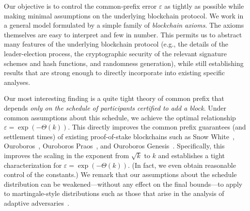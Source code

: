 Our objective is to control the common-prefix error
$\varepsilon$ as tightly as possible while
making minimal assumptions on the underlying blockchain
protocol.  We work in a general model formulated by a simple family of
\emph{blockchain axioms}. The axioms themselves are easy to interpret
and few in number. This permits us to abstract many features of the
underlying blockchain protocol (e.g., the details of the
leader-election process, the cryptographic security of the relevant
signature schemes and hash functions, and randomness generation),
while still establishing results that are strong enough to directly
incorporate into existing specific analyses.

Our most interesting finding is a quite tight theory of common prefix
that depends \emph{only on the schedule of participants certified to
  add a block}. Under common assumptions about this schedule, we
achieve the optimal relationship $\varepsilon =
\exp(-\Theta(k))$. This directly improves the common prefix guarantees
(and settlement times) of existing proof-of-stake blockchains such as
Snow White~\cite{DBLP:journals/iacr/BentovPS16a},
Ouroboros~\cite{KRDO17}, Ouroboros
Praos~\cite{DBLP:conf/eurocrypt/DavidGKR18}, and Ouroboros
Genesis~\cite{DBLP:journals/iacr/BadertscherGKRZ18}.
%
Specifically, this improves the scaling in the exponent from
$\sqrt{k}$ to $k$ and establishes a tight characterization for
$\varepsilon = \exp(-\Theta(k))$. (In fact, we even obtain reasonable
control of the constants.)  We remark that our assumptions about the
schedule distribution can be weakened---without any effect on the
final bounds---to apply to martingale-style distributions such
as those that arise in the analysis of adaptive
adversaries~\cite{DBLP:conf/eurocrypt/DavidGKR18,DBLP:journals/iacr/BadertscherGKRZ18}.

